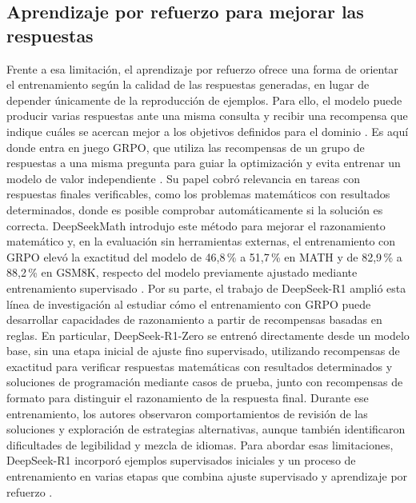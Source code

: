 \subsection{Aprendizaje por refuerzo para mejorar las respuestas}
Frente a esa limitación, el aprendizaje por refuerzo ofrece una forma de orientar el entrenamiento según la calidad de las respuestas generadas, en lugar de depender únicamente de la reproducción de ejemplos. Para ello, el modelo puede producir varias respuestas ante una misma consulta y recibir una recompensa que indique cuáles se acercan mejor a los objetivos definidos para el dominio \cite{ouyang2022instructgpt}. Es aquí donde entra en juego GRPO, que utiliza las recompensas de un grupo de respuestas a una misma pregunta para guiar la optimización y evita entrenar un modelo de valor independiente \cite{shao2024deepseekmath}. Su papel cobró relevancia en tareas con respuestas finales verificables, como los problemas matemáticos con resultados determinados, donde es posible comprobar automáticamente si la solución es correcta. DeepSeekMath introdujo este método para mejorar el razonamiento matemático y, en la evaluación sin herramientas externas, el entrenamiento con GRPO elevó la exactitud del modelo de 46,8\,\% a 51,7\,\% en MATH y de 82,9\,\% a 88,2\,\% en GSM8K, respecto del modelo previamente ajustado mediante entrenamiento supervisado \cite{shao2024deepseekmath}. Por su parte, el trabajo de DeepSeek-R1 amplió esta línea de investigación al estudiar cómo el entrenamiento con GRPO puede desarrollar capacidades de razonamiento a partir de recompensas basadas en reglas. En particular, DeepSeek-R1-Zero se entrenó directamente desde un modelo base, sin una etapa inicial de ajuste fino supervisado, utilizando recompensas de exactitud para verificar respuestas matemáticas con resultados determinados y soluciones de programación mediante casos de prueba, junto con recompensas de formato para distinguir el razonamiento de la respuesta final. Durante ese entrenamiento, los autores observaron comportamientos de revisión de las soluciones y exploración de estrategias alternativas, aunque también identificaron dificultades de legibilidad y mezcla de idiomas. Para abordar esas limitaciones, DeepSeek-R1 incorporó ejemplos supervisados iniciales y un proceso de entrenamiento en varias etapas que combina ajuste supervisado y aprendizaje por refuerzo \cite{deepseek2025r1}.

